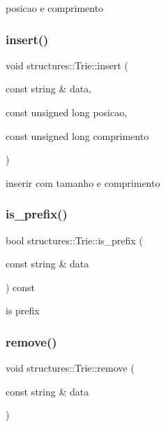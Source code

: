 posicao e comprimento 

\mbox{\label{classstructures_1_1Trie_a9a580a15a1582b408aa776d7539ea452}} 
\subsubsection{\texorpdfstring{insert()}{insert()}}
{\footnotesize\ttfamily void structures\+::\+Trie\+::insert (\begin{DoxyParamCaption}\item[{const string \&}]{data,  }\item[{const unsigned long}]{posicao,  }\item[{const unsigned long}]{comprimento }\end{DoxyParamCaption})}



inserir com tamanho e comprimento 

\mbox{\label{classstructures_1_1Trie_a1a7dcbc0533cc7b1e5ab8ce517b75b6b}} 
\subsubsection{\texorpdfstring{is\_prefix()}{is\_prefix()}}
{\footnotesize\ttfamily bool structures\+::\+Trie\+::is\+\_\+prefix (\begin{DoxyParamCaption}\item[{const string \&}]{data }\end{DoxyParamCaption}) const}



is prefix 

\mbox{\label{classstructures_1_1Trie_af6f528e22594b9b83bc78b81fdc88fd0}} 
\subsubsection{\texorpdfstring{remove()}{remove()}}
{\footnotesize\ttfamily void structures\+::\+Trie\+::remove (\begin{DoxyParamCaption}\item[{const string \&}]{data }\end{DoxyParamCaption})}



